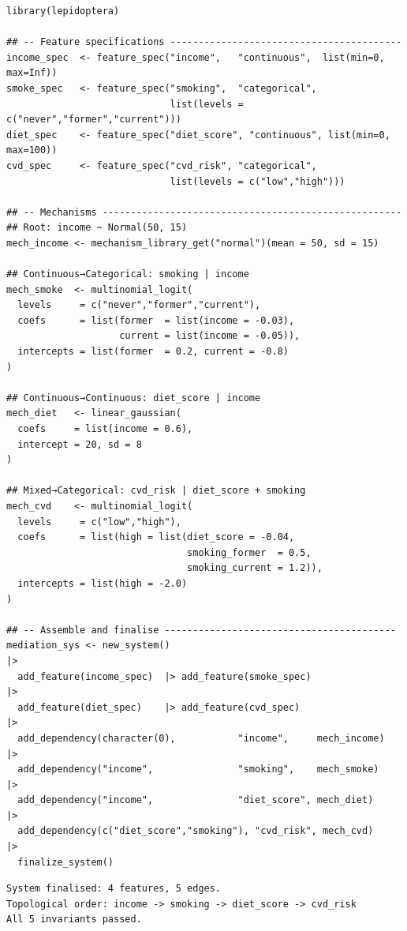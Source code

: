 \documentclass[12pt,a4paper]{article}
\begin{document}
\begin{tcolorbox}[codebox, title={\small\textbf{R} code}]
\begin{verbatim}
library(lepidoptera)

## -- Feature specifications -----------------------------------------
income_spec  <- feature_spec("income",   "continuous",  list(min=0, max=Inf))
smoke_spec   <- feature_spec("smoking",  "categorical",
                             list(levels = c("never","former","current")))
diet_spec    <- feature_spec("diet_score", "continuous", list(min=0, max=100))
cvd_spec     <- feature_spec("cvd_risk", "categorical",
                             list(levels = c("low","high")))

## -- Mechanisms -----------------------------------------------------
## Root: income ~ Normal(50, 15)
mech_income <- mechanism_library_get("normal")(mean = 50, sd = 15)

## Continuous→Categorical: smoking | income
mech_smoke  <- multinomial_logit(
  levels     = c("never","former","current"),
  coefs      = list(former  = list(income = -0.03),
                    current = list(income = -0.05)),
  intercepts = list(former  = 0.2, current = -0.8)
)

## Continuous→Continuous: diet_score | income
mech_diet   <- linear_gaussian(
  coefs     = list(income = 0.6),
  intercept = 20, sd = 8
)

## Mixed→Categorical: cvd_risk | diet_score + smoking
mech_cvd    <- multinomial_logit(
  levels     = c("low","high"),
  coefs      = list(high = list(diet_score = -0.04,
                                smoking_former  = 0.5,
                                smoking_current = 1.2)),
  intercepts = list(high = -2.0)
)

## -- Assemble and finalise -----------------------------------------
mediation_sys <- new_system()                                         |>
  add_feature(income_spec)  |> add_feature(smoke_spec)               |>
  add_feature(diet_spec)    |> add_feature(cvd_spec)                  |>
  add_dependency(character(0),           "income",     mech_income)  |>
  add_dependency("income",               "smoking",    mech_smoke)   |>
  add_dependency("income",               "diet_score", mech_diet)    |>
  add_dependency(c("diet_score","smoking"), "cvd_risk", mech_cvd)    |>
  finalize_system()
\end{verbatim}
\end{tcolorbox}

\begin{tcolorbox}[outputbox, title={\small Output}]
\begin{verbatim}
System finalised: 4 features, 5 edges.
Topological order: income -> smoking -> diet_score -> cvd_risk
All 5 invariants passed.
\end{verbatim}
\end{tcolorbox}
\end{document}
